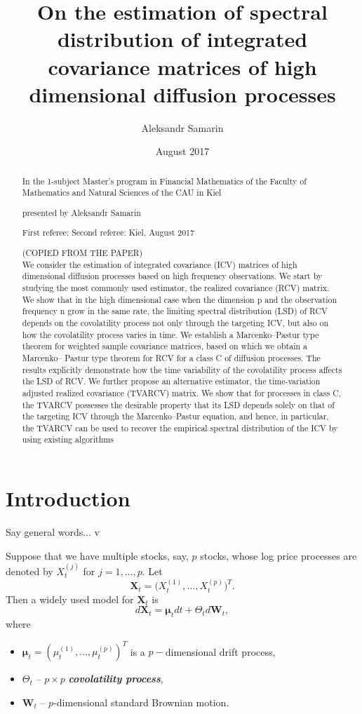 \documentclass[a4paper,11pt]{article}
\title{On the estimation of spectral distribution of integrated covariance matrices of high dimensional diffusion processes}
\author{Aleksandr Samarin}
\date{August 2017}
\theoremstyle{plain}
\theoremstyle{definition}
\newcommand{\define}[1]{\textit{\textbf{#1}}}
\begin{document}
	
	\maketitle
	
	\begin{abstract}
		In the 1-subject Master's program in Financial Mathematics of the Faculty of Mathematics and Natural Sciences of the CAU in Kiel
		
		presented by Aleksandr Samarin
		
		First referee:
		Second referee:
		Kiel, August 2017
		
		(COPIED FROM THE PAPER) \\
		We consider the estimation of integrated covariance (ICV) matrices
		of high dimensional diffusion processes based on high frequency
		observations. We start by studying the most commonly used estimator,
		the realized covariance (RCV) matrix. We show that in the
		high dimensional case when the dimension p and the observation frequency
		n grow in the same rate, the limiting spectral distribution
		(LSD) of RCV depends on the covolatility process not only through
		the targeting ICV, but also on how the covolatility process varies in
		time. We establish a Marcenko–Pastur type theorem for weighted
		sample covariance matrices, based on which we obtain a Marcenko–
		Pastur type theorem for RCV for a class C of diffusion processes.
		The results explicitly demonstrate how the time variability of the
		covolatility process affects the LSD of RCV. We further propose
		an alternative estimator, the time-variation adjusted realized covariance
		(TVARCV) matrix. We show that for processes in class C, the
		TVARCV possesses the desirable property that its LSD depends
		solely on that of the targeting ICV through the Marcenko–Pastur
		equation, and hence, in particular, the TVARCV can be used to recover
		the empirical spectral distribution of the ICV by using existing
		algorithms
	\end{abstract}
	
	\pagebreak
	\tableofcontents
	
	\pagebreak
	\part{Introduction}
    Say general words...  v
    
    Suppose that we have multiple stocks, say, $p$ stocks, whose log price processes are denoted by $X_t^{(j)}$ for $j = 1, \dots, p$. Let
	\[ \mathbf{X}_t = \big(X_t^{(1)}, \dots, X_t^{(p)}\big)^T. \]
	Then a widely used model for $\mathbf{X}_t$ is
	\begin{equation} \label{X diffeq}
		d\mathbf{X}_t = \mathbf{\mu}_t dt + \Theta_td\mathbf{W}_t,
	\end{equation}
	where 
	\begin{itemize}
		\item $\mathbf{\mu}_t = (\mu_t^{(1)}, \dots, \mu_t^{(p)})^T$ is a $p-$dimensional drift process,
		\item $\Theta_t$ -- $p \times p$ \define{covolatility process},
		\item $\mathbf{W}_t$ -- $p$-dimensional standard Brownian motion.
	\end{itemize}
\end{document}
